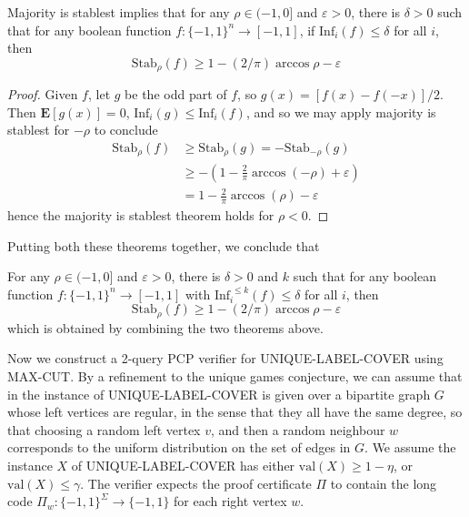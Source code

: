 \begin{theorem}
    Majority is stablest implies that for any $\rho \in (-1,0]$ and $\varepsilon > 0$, there is $\delta > 0$ such that for any boolean function $f: \{ -1, 1 \}^n \to [-1,1]$, if $\text{Inf}_i(f) \leq \delta$ for all $i$, then
    \[ \text{Stab}_\rho(f) \geq 1 - (2/\pi) \arccos \rho - \varepsilon \]
\end{theorem}
\begin{proof}
    Given $f$, let $g$ be the odd part of $f$, so $g(x) = [f(x) - f(-x)]/2$. Then $\mathbf{E}[g(x)] = 0$, $\text{Inf}_i(g) \leq \text{Inf}_i(f)$, and so we may apply majority is stablest for $-\rho$ to conclude
    \begin{align*}
        \text{Stab}_\rho(f) &\geq \text{Stab}_\rho(g) = -\text{Stab}_{-\rho}(g)\\
        &\geq - \left( 1 - \frac{2}{\pi} \arccos(-\rho) + \varepsilon \right)\\
        &= 1 - \frac{2}{\pi} \arccos(\rho) - \varepsilon
    \end{align*}
    hence the majority is stablest theorem holds for $\rho < 0$.
\end{proof}

Putting both these theorems together, we conclude that

\begin{theorem}
    For any $\rho \in (-1,0]$ and $\varepsilon > 0$, there is $\delta > 0$ and $k$ such that for any boolean function $f: \{ -1, 1 \}^n \to [-1,1]$ with $\text{Inf}_i^{\ \leq k}(f) \leq \delta$ for all $i$, then
    \[ \text{Stab}_\rho(f) \geq 1 - (2/\pi) \arccos \rho - \varepsilon \]
    which is obtained by combining the two theorems above.
\end{theorem}

Now we construct a 2-query PCP verifier for UNIQUE-LABEL-COVER using MAX-CUT. By a refinement to the unique games conjecture, we can assume that in the instance of UNIQUE-LABEL-COVER is given over a bipartite graph $G$ whose left vertices are regular, in the sense that they all have the same degree, so that choosing a random left vertex $v$, and then a random neighbour $w$ corresponds to the uniform distribution on the set of edges in $G$. We assume the instance $X$ of UNIQUE-LABEL-COVER has either $\text{val}(X) \geq 1 - \eta$, or $\text{val}(X) \leq \gamma$. The verifier expects the proof certificate $\Pi$ to contain the long code $\Pi_w: \{ -1, 1 \}^\Sigma \to \{ -1, 1 \}$ for each right vertex $w$.

